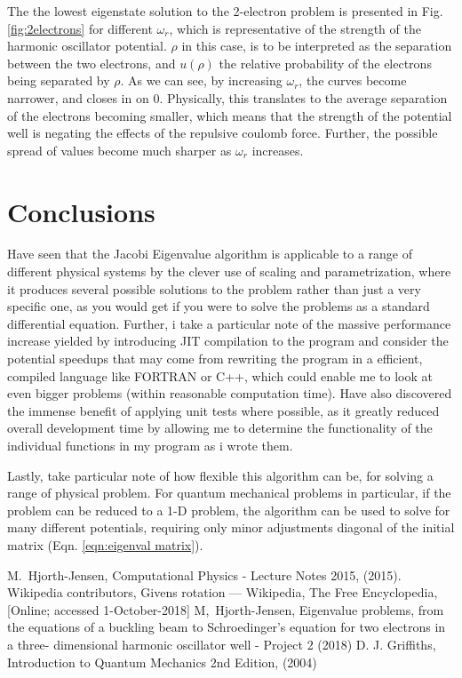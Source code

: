 \documentclass[10pt,showpacs,preprintnumbers,footinbib,amsmath,amssymb,aps,prl,twocolumn,groupedaddress,superscriptaddress,showkeys]{revtex4-1}
\begin{document}
  The the lowest eigenstate solution to the 2-electron problem is presented in Fig. \ref{fig:2electrons} for different $\omega_r$, which is representative of the strength of the harmonic oscillator potential. $\rho$ in this case, is to be interpreted as the separation between the two electrons, and $u(\rho)$ the relative probability of the electrons being separated by $\rho$. As we can see, by increasing $\omega_r$, the curves become narrower, and closes in on $0$. Physically, this translates to the average separation of the electrons becoming smaller, which means that the strength of the potential well is negating the effects of the repulsive coulomb force. Further, the possible spread of values become much sharper as $\omega_r$ increases.

\section{Conclusions}
  Have seen that the Jacobi Eigenvalue algorithm is applicable to a range of different physical systems by the clever use of scaling and parametrization, where it produces several possible solutions to the problem rather than just a very specific one, as you would get if you were to solve the problems as a standard differential equation. Further, i take a particular note of the massive performance increase yielded by introducing JIT compilation to the program and consider the potential speedups that may come from rewriting the program in a efficient, compiled language like FORTRAN or C++, which could enable me to look at even bigger problems (within reasonable computation time).
  Have also discovered the immense benefit of applying unit tests where possible, as it greatly reduced overall development time by allowing me to determine the functionality of the individual functions in my program as i wrote them.

  Lastly, take particular note of how flexible this algorithm can be, for solving a range of physical problem. For quantum mechanical problems in particular, if the problem can be reduced to a 1-D problem, the algorithm can be used to solve for many different potentials, requiring only minor adjustments diagonal of the initial matrix (Eqn. \ref{eqn:eigenval matrix}).


\begin{thebibliography}{99}
 M.~Hjorth-Jensen, Computational Physics - Lecture Notes 2015, (2015).
 Wikipedia contributors, Givens rotation --- {Wikipedia}{,} The Free Encyclopedia, [Online; accessed 1-October-2018]
 M,~Hjorth-Jensen, Eigenvalue problems, from the equations of a buckling beam
to Schroedinger’s equation for two electrons in a three-
dimensional harmonic oscillator well - Project 2 (2018)
 D. J. Griffiths, Introduction to Quantum Mechanics 2nd Edition, (2004)
\end{thebibliography}
\end{document}

